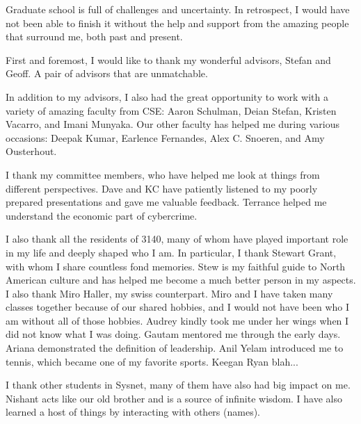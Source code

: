 \documentclass[12pt]{ucsddissertation}
\begin{document}
\begin{acknowledgements}
Graduate school is full of challenges and uncertainty. In retrospect, I would have not been able to finish it without the help and support from the amazing people that surround me, both past and present.

First and foremost, I would like to thank my wonderful advisors, Stefan and Geoff. A pair of advisors that are unmatchable. 

In addition to my advisors, I also had the great opportunity to work with a variety of amazing faculty from CSE: Aaron Schulman, Deian Stefan, Kristen Vacarro, and Imani Munyaka. Our other faculty has helped me during various occasions: Deepak Kumar, Earlence Fernandes, Alex C. Snoeren, and Amy Ousterhout.

I thank my committee members, who have helped me look at things from different perspectives.  Dave and KC have patiently listened to my poorly prepared presentations and gave me valuable feedback. Terrance helped me understand the economic part of cybercrime.

I also thank all the residents of 3140, many of whom have played important role in my life and deeply shaped who I am. In particular, I thank Stewart Grant, with whom I share countless fond memories. Stew is my faithful guide to North American culture and has helped me become a much better person in my aspects. I also thank Miro Haller, my swiss counterpart. Miro and I have
 taken many classes together because of our shared hobbies, and I would not have been who I am without all of those hobbies. Audrey kindly took me under her wings when I did not know what I was doing. Gautam mentored me through the early days. Ariana demonstrated the definition of leadership. Anil Yelam introduced me to tennis, which became one of my favorite sports. Keegan Ryan blah...

I thank other students in Sysnet, many of them have also had big impact on me. Nishant acts like our old brother and is a source of infinite wisdom. I have also learned a host of things by interacting with others (names).


\end{acknowledgements}
\end{document}
